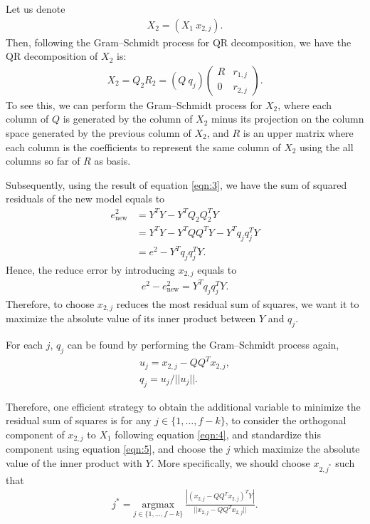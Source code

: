 \documentclass[12pt]{article}
\newcommand{\xln}[1]{x_{#1}}
\begin{document}
Let us denote
\begin{align*}
	X_{2} = (X_1~x_{2,j} ).
\end{align*}
Then, following  the Gram–Schmidt process for QR decomposition,
we have the QR decomposition of $X_{2}$ is:
\begin{align}
	X_2  = Q_2R_2 = (Q~q_j)  \left( \begin{array}{cc}  R&r_{1,j} \\
		0&r_{2,j} \end{array} \right). \label{eqn:8}
\end{align}
To see this, we can perform the Gram–Schmidt process for 
$X_2$, where each column of $Q$ is generated by the column
of $X_2$ minus its projection on the column space generated by
the previous column of $X_2$, and $R$ is an upper matrix where
each column is the coefficients to represent the same column  of
$X_2$ using the all columns so far of $R$ as basis.

Subsequently, using the result of equation \eqref{eqn:3},
we have the sum of squared residuals of the new model 
equals to
\begin{align*}
	e_{\text{new}}^2 &= Y^TY - Y^TQ_2Q_2^TY\\
	&= Y^TY - Y^TQQ^TY - Y^T q_jq_j^TY\\
	&=e^2 - Y^T q_jq_j^TY.
\end{align*}
Hence, the reduce error by introducing $x_{2,j}$ equals to
\begin{align*}
	e^2 - e_{\text{new}}^2 =  Y^T q_jq_j^TY.
\end{align*}
Therefore, to choose $x_{2,j}$ reduces the most residual sum of squares,
we want it to maximize the absolute value of its
inner product between $Y$ and $q_j$.

For each $j$, $q_j$ can be found by performing the
Gram–Schmidt process again,
\begin{align}
	u_j = x_{2,j} - QQ^Tx_{2,j}, \label{eqn:4}\\
   q_j = u_j / ||u_j||. \label{eqn:5}
\end{align}

Therefore, one efficient strategy to obtain the additional
variable to minimize the residual sum of squares is
for any $j \in \{1, \ldots, f-k\}$,
to consider the orthogonal component of $\xln{2,j}$ to $X_1$ following 
equation \eqref{eqn:4}, and standardize this component using
equation \eqref{eqn:5}, and choose the $j$ which maximize
the absolute value of the inner product with $Y$. More specifically,
we should choose $x_{2,j^*}$ such that
\begin{align}
	j^* =  \underset{j \in \{1, \ldots, f-k\}}{\mathrm{argmax}}~ \frac{|(x_{2,j} - QQ^Tx_{2,j})^TY |}{||x_{2,j} - QQ^Tx_{2,j}||}. \label{eqn:6}
\end{align}
\end{document}
